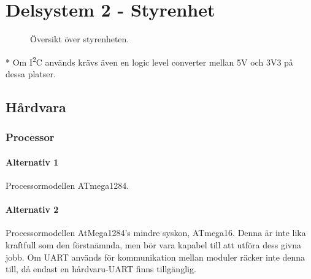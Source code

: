 \documentclass[a4paper,11pt]{article}
\begin{document}
\section{Delsystem 2 - Styrenhet} \label{sec:system2}
\begin{figure}[h!]
    \caption{Översikt över styrenheten.}
    \label{fig:modules}
\end{figure}
\noindent \begin{small}
    * Om I\textsuperscript{2}C används krävs även en logic level converter mellan 5V och 3V3 på dessa platser.
\end{small}
\subsection{Hårdvara}

\subsubsection{Processor}

\paragraph{Alternativ 1}
Processormodellen ATmega1284.

\paragraph{Alternativ 2}
Processormodellen AtMega1284's mindre syskon, ATmega16. Denna är inte lika kraftfull som den förstnämnda, men bör vara kapabel till att utföra dess givna jobb. Om UART används för kommunikation mellan moduler räcker inte denna till, då endast en hårdvaru-UART finns tillgänglig.
\end{document}
